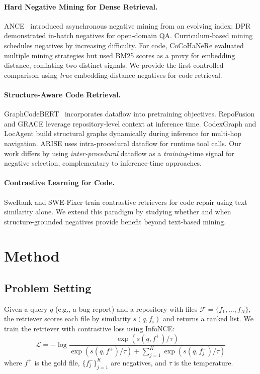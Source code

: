 \documentclass[11pt,a4paper]{article}
\begin{document}
\paragraph{Hard Negative Mining for Dense Retrieval.}
ANCE~\cite{xiong2020approximate} introduced asynchronous negative mining from an evolving index; DPR~\cite{karpukhin2020dense} demonstrated in-batch negatives for open-domain QA. Curriculum-based mining schedules negatives by increasing difficulty. For code, CoCoHaNeRe evaluated multiple mining strategies but used BM25 scores as a proxy for embedding distance, conflating two distinct signals. We provide the first controlled comparison using \emph{true} embedding-distance negatives for code retrieval.

\paragraph{Structure-Aware Code Retrieval.}
GraphCodeBERT~\cite{guo2021graphcodebert} incorporates dataflow into pretraining objectives. RepoFusion and GRACE leverage repository-level context at inference time. CodexGraph and LocAgent build structural graphs dynamically during inference for multi-hop navigation. ARISE uses intra-procedural dataflow for runtime tool calls. Our work differs by using \emph{inter-procedural} dataflow as a \emph{training}-time signal for negative selection, complementary to inference-time approaches.

\paragraph{Contrastive Learning for Code.}
SweRank and SWE-Fixer train contrastive retrievers for code repair using text similarity alone. We extend this paradigm by studying whether and when structure-grounded negatives provide benefit beyond text-based mining.

\section{Method}
\label{sec:method}

\subsection{Problem Setting}

Given a query $q$ (e.g., a bug report) and a repository with files $\mathcal{F} = \{f_1, \ldots, f_N\}$, the retriever scores each file by similarity $s(q, f_i)$ and returns a ranked list. We train the retriever with contrastive loss using InfoNCE:
\begin{equation}
\mathcal{L} = -\log \frac{\exp(s(q, f^+)/\tau)}{\exp(s(q, f^+)/\tau) + \sum_{j=1}^{K} \exp(s(q, f_j^-)/\tau)}
\end{equation}
where $f^+$ is the gold file, $\{f_j^-\}_{j=1}^K$ are negatives, and $\tau$ is the temperature.
\end{document}
